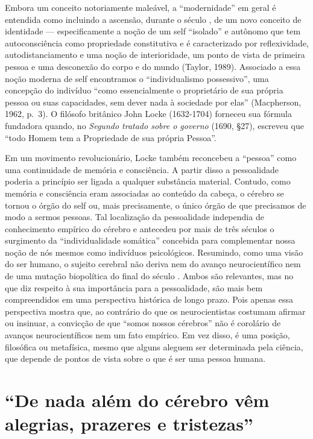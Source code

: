 Embora um conceito notoriamente maleável, a ``modernidade'' em geral é
entendida como incluindo a ascensão, durante o século , de um novo
conceito de identidade --- especificamente a noção de um self
``isolado'' e autônomo que tem autoconsciência como propriedade
constitutiva e é caracterizado por reflexividade, autodistanciamento e
uma noção de interioridade, um ponto de vista de primeira pessoa e uma
desconexão do corpo e do mundo (Taylor, 1989). Associado a essa noção
moderna de self encontramos o ``individualismo possessivo'', uma
concepção do indivíduo ``como essencialmente o proprietário de sua
própria pessoa ou suas capacidades, sem dever nada à sociedade por
elas'' (Macpherson, 1962, p.~3). O filósofo britânico John Locke
(1632-1704) forneceu sua fórmula fundadora quando, no \emph{Segundo
tratado sobre o governo} (1690, §27), escreveu que ``todo Homem tem a
Propriedade de sua própria Pessoa''.

Em um movimento revolucionário, Locke também reconcebeu a ``pessoa''
como uma continuidade de memória e consciência. A partir disso a
pessoalidade poderia a princípio ser ligada a qualquer substância
material. Contudo, como memória e consciência eram associadas ao
conteúdo da cabeça, o cérebro se tornou o órgão do self ou, mais
precisamente, o único órgão de que precisamos de modo a sermos pessoas.
Tal localização da pessoalidade independia de conhecimento empírico do
cérebro e antecedeu por mais de três séculos o surgimento da
``individualidade somática'' concebida para complementar nossa noção de
nós mesmos como indivíduos psicológicos. Resumindo, como uma visão do
ser humano, o sujeito cerebral não deriva nem do avanço neurocientífico
nem de uma mutação biopolítica do final do século . Ambos são
relevantes, mas no que diz respeito à sua importância para a
pessoalidade, são mais bem compreendidos em uma perspectiva histórica de
longo prazo. Pois apenas essa perspectiva mostra que, ao contrário do
que os neurocientistas costumam afirmar ou insinuar, a convicção de que
``somos nossos cérebros'' não é corolário de avanços neurocientíficos
nem um fato empírico. Em vez disso, é uma posição, filosófica ou
metafísica, mesmo que alguns aleguem ser determinada pela ciência, que
depende de pontos de vista sobre o que é ser uma pessoa humana.

\section{``De nada além do cérebro vêm alegrias, prazeres e tristezas''}

